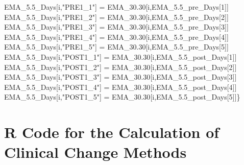 \documentclass[12pt,twoside]{reedthesis}
\newenvironment{Shaded}{\begin{snugshade}}{\end{snugshade}}
\newcommand{\DecValTok}[1]{\textcolor[rgb]{0.00,0.00,0.81}{#1}}
\newcommand{\FloatTok}[1]{\textcolor[rgb]{0.00,0.00,0.81}{#1}}
\newcommand{\NormalTok}[1]{#1}
\newcommand{\StringTok}[1]{\textcolor[rgb]{0.31,0.60,0.02}{#1}}
\begin{document}
\begin{Shaded}
\begin{Highlighting}[]
\NormalTok{  EMA_}\FloatTok{5.5}\NormalTok{_Days[i,}\StringTok{"PRE1_1"}\NormalTok{] =}\StringTok{ }\NormalTok{EMA_}\FloatTok{30.30}\NormalTok{[i,EMA_}\FloatTok{5.5}\NormalTok{_pre_Days[}\DecValTok{1}\NormalTok{]]}
\NormalTok{  EMA_}\FloatTok{5.5}\NormalTok{_Days[i,}\StringTok{"PRE1_2"}\NormalTok{] =}\StringTok{ }\NormalTok{EMA_}\FloatTok{30.30}\NormalTok{[i,EMA_}\FloatTok{5.5}\NormalTok{_pre_Days[}\DecValTok{2}\NormalTok{]]}
\NormalTok{  EMA_}\FloatTok{5.5}\NormalTok{_Days[i,}\StringTok{"PRE1_3"}\NormalTok{] =}\StringTok{ }\NormalTok{EMA_}\FloatTok{30.30}\NormalTok{[i,EMA_}\FloatTok{5.5}\NormalTok{_pre_Days[}\DecValTok{3}\NormalTok{]]}
\NormalTok{  EMA_}\FloatTok{5.5}\NormalTok{_Days[i,}\StringTok{"PRE1_4"}\NormalTok{] =}\StringTok{ }\NormalTok{EMA_}\FloatTok{30.30}\NormalTok{[i,EMA_}\FloatTok{5.5}\NormalTok{_pre_Days[}\DecValTok{4}\NormalTok{]]}
\NormalTok{  EMA_}\FloatTok{5.5}\NormalTok{_Days[i,}\StringTok{"PRE1_5"}\NormalTok{] =}\StringTok{ }\NormalTok{EMA_}\FloatTok{30.30}\NormalTok{[i,EMA_}\FloatTok{5.5}\NormalTok{_pre_Days[}\DecValTok{5}\NormalTok{]]}
\NormalTok{  EMA_}\FloatTok{5.5}\NormalTok{_Days[i,}\StringTok{"POST1_1"}\NormalTok{] =}\StringTok{ }\NormalTok{EMA_}\FloatTok{30.30}\NormalTok{[i,EMA_}\FloatTok{5.5}\NormalTok{_post_Days[}\DecValTok{1}\NormalTok{]]}
\NormalTok{  EMA_}\FloatTok{5.5}\NormalTok{_Days[i,}\StringTok{"POST1_2"}\NormalTok{] =}\StringTok{ }\NormalTok{EMA_}\FloatTok{30.30}\NormalTok{[i,EMA_}\FloatTok{5.5}\NormalTok{_post_Days[}\DecValTok{2}\NormalTok{]]}
\NormalTok{  EMA_}\FloatTok{5.5}\NormalTok{_Days[i,}\StringTok{"POST1_3"}\NormalTok{] =}\StringTok{ }\NormalTok{EMA_}\FloatTok{30.30}\NormalTok{[i,EMA_}\FloatTok{5.5}\NormalTok{_post_Days[}\DecValTok{3}\NormalTok{]]}
\NormalTok{  EMA_}\FloatTok{5.5}\NormalTok{_Days[i,}\StringTok{"POST1_4"}\NormalTok{] =}\StringTok{ }\NormalTok{EMA_}\FloatTok{30.30}\NormalTok{[i,EMA_}\FloatTok{5.5}\NormalTok{_post_Days[}\DecValTok{4}\NormalTok{]]}
\NormalTok{  EMA_}\FloatTok{5.5}\NormalTok{_Days[i,}\StringTok{"POST1_5"}\NormalTok{] =}\StringTok{ }\NormalTok{EMA_}\FloatTok{30.30}\NormalTok{[i,EMA_}\FloatTok{5.5}\NormalTok{_post_Days[}\DecValTok{5}\NormalTok{]]\}}
\end{Highlighting}
\end{Shaded}
\hypertarget{r-code-for-the-calculation-of-clinical-change-methods}{%
\section{R Code for the Calculation of Clinical Change Methods}\label{r-code-for-the-calculation-of-clinical-change-methods}}
\end{document}
